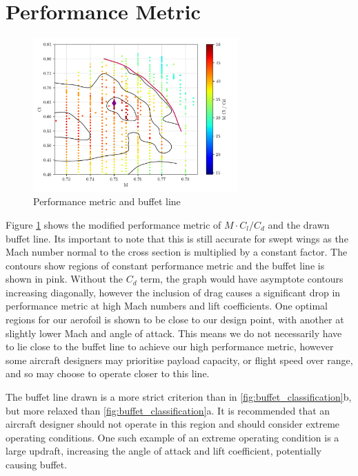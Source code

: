 \documentclass{article}
\begin{document}
\section{Performance Metric}

\begin{figure}[H]
    \centering
    \includegraphics[width=0.7\textwidth]{figures/performance_metric.png}
    \caption{Performance metric and buffet line}
    \label{fig:performance_metric}
\end{figure}

Figure \ref{fig:performance_metric} shows the modified performance metric of $M \cdot C_l/C_d$ and the drawn buffet line.
Its important to note that this is still accurate for swept wings as the Mach number normal to the cross section is multiplied by a constant factor.
The contours show regions of constant performance metric and the buffet line is shown in pink.
Without the $C_d$ term, the graph would have asymptote contours increasing diagonally, however the inclusion of drag
causes a significant drop in performance metric at high Mach numbers and lift coefficients.
One optimal regions for our aerofoil is shown to be close to our design point, with another at slightly lower Mach and angle of attack.
This means we do not necessarily have to lie close to the buffet line to achieve our high performance metric, however some aircraft designers
may prioritise payload capacity, or flight speed over range, and so may choose to operate closer to this line.

The buffet line drawn is a more strict criterion than in \ref{fig:buffet_classification}b, but more relaxed than \ref{fig:buffet_classification}a.
It is recommended that an aircraft designer should not operate in this region and should consider extreme operating conditions.
One such example of an extreme operating condition is a large updraft, increasing the angle of attack and lift coefficient, potentially causing buffet.
\end{document}
